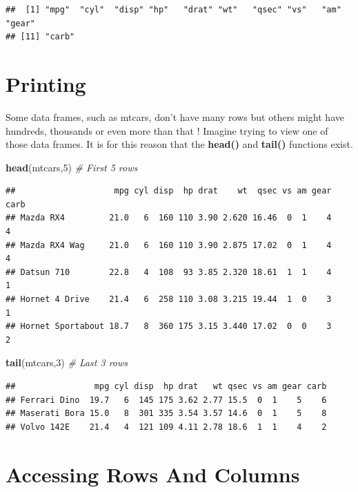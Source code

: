\documentclass[]{book}
\newenvironment{Shaded}{\begin{snugshade}}{\end{snugshade}}
\newcommand{\KeywordTok}[1]{\textcolor[rgb]{0.13,0.29,0.53}{\textbf{#1}}}
\newcommand{\DecValTok}[1]{\textcolor[rgb]{0.00,0.00,0.81}{#1}}
\newcommand{\CommentTok}[1]{\textcolor[rgb]{0.56,0.35,0.01}{\textit{#1}}}
\newcommand{\NormalTok}[1]{#1}
\begin{document}
\begin{verbatim}
##  [1] "mpg"  "cyl"  "disp" "hp"   "drat" "wt"   "qsec" "vs"   "am"   "gear"
## [11] "carb"
\end{verbatim}

\section{Printing}\label{printing}

Some data frames, such as mtcars, don't have many rows but others might
have hundreds, thousands or even more than that ! Imagine trying to view
one of those data frames. It is for this reason that the \textbf{head()}
and \textbf{tail()} functions exist.

\begin{Shaded}
\begin{Highlighting}[]
\KeywordTok{head}\NormalTok{(mtcars,}\DecValTok{5}\NormalTok{) }\CommentTok{# First 5 rows}
\end{Highlighting}
\end{Shaded}

\begin{verbatim}
##                    mpg cyl disp  hp drat    wt  qsec vs am gear carb
## Mazda RX4         21.0   6  160 110 3.90 2.620 16.46  0  1    4    4
## Mazda RX4 Wag     21.0   6  160 110 3.90 2.875 17.02  0  1    4    4
## Datsun 710        22.8   4  108  93 3.85 2.320 18.61  1  1    4    1
## Hornet 4 Drive    21.4   6  258 110 3.08 3.215 19.44  1  0    3    1
## Hornet Sportabout 18.7   8  360 175 3.15 3.440 17.02  0  0    3    2
\end{verbatim}

\begin{Shaded}
\begin{Highlighting}[]
\KeywordTok{tail}\NormalTok{(mtcars,}\DecValTok{3}\NormalTok{) }\CommentTok{# Last 3 rows}
\end{Highlighting}
\end{Shaded}

\begin{verbatim}
##                mpg cyl disp  hp drat   wt qsec vs am gear carb
## Ferrari Dino  19.7   6  145 175 3.62 2.77 15.5  0  1    5    6
## Maserati Bora 15.0   8  301 335 3.54 3.57 14.6  0  1    5    8
## Volvo 142E    21.4   4  121 109 4.11 2.78 18.6  1  1    4    2
\end{verbatim}

\section{Accessing Rows And Columns}\label{accessing-rows-and-columns}
\end{document}
